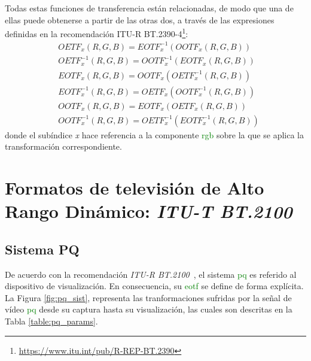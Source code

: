 \documentclass[a4paper, 12pt]{report}
\begin{document}
Todas estas funciones de transferencia están relacionadas, de modo que una de ellas puede obtenerse a partir de las otras dos, a través de las expresiones definidas en la recomendación ITU-R BT.2390-4\footnote{\url{https://www.itu.int/pub/R-REP-BT.2390}}:\\
\footnotesize
\begin{subequations}
    \label{subeq:tf_def}
    \begin{eqnarray}
        &OETF_x(R, G, B) = EOTF^{-1}_x(OOTF_x(R, G, B)) \\ 
        &OETF^{-1}_x(R, G, B) = OOTF^{-1}_x(EOTF_x (R, G, B)) \\ 
        &EOTF_x(R, G, B) = OOTF_x(OETF^{-1}_x (R, G, B))  \\ 
        &EOTF^{-1}_x(R, G, B) = OETF_x(OOTF^{-1}_x (R, G, B)) \\            
        &OOTF_x(R, G, B) = EOTF_x(OETF_x (R, G, B)) \\
        &OOTF^{-1}_x(R, G, B) = OETF^{-1}_x(EOTF^{-1}_x (R, G, B))
    \end{eqnarray}
\end{subequations}
\normalsize
donde el  subíndice \textit{x} hace referencia a la  componente \textcolor{green}{rgb} sobre la que se aplica la transformación correspondiente.


\cleardoublepage
\chapter{Formatos de televisión de Alto Rango Dinámico: \textit{ITU-T BT.2100}}
\label{chap:formatos_hdr}


\section{Sistema PQ}
\label{sec:sistema_pq_teoria}

De acuerdo con la recomendación \textit{ITU-R BT.2100}~\cite{itu_r:_bt2100}, el sistema \textcolor{green}{pq} es referido al dispositivo de visualización. En consecuencia, su \textcolor{green}{eotf} se define de forma explícita. La Figura \ref{fig:pq_sist}, representa las tranformaciones sufridas por la señal de vídeo \textcolor{green}{pq} desde su captura hasta su visualización, las cuales son descritas en la Tabla \ref{table:pq_params}.
\end{document}
